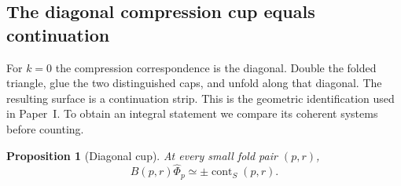 \documentclass[11pt]{amsart}
\newtheorem{proposition}[theorem]{Proposition}
\theoremstyle{definition}
\theoremstyle{remark}
\theoremstyle{plain}
\numberwithin{equation}{section}
\newcommand{\cont}{\operatorname{cont}}
\begin{document}
\subsection{The diagonal compression cup equals continuation}
For $k=0$ the compression correspondence
is the diagonal. Double the folded
triangle, glue the two distinguished
caps, and unfold along that diagonal.
The resulting surface is a continuation
strip. This is the geometric
identification used in Paper~I. To
obtain an integral statement we compare
its coherent systems before counting.

\begin{proposition}[Diagonal cup]\label{prop:diagonal-cup}
At every small fold pair $(p,r)$,
\begin{equation}\label{eq:diagonal-cup}
 B(p,r)\widehat\Phi_p\simeq
                  \pm\cont_S(p,r).
\end{equation}
\end{proposition}
\end{document}
